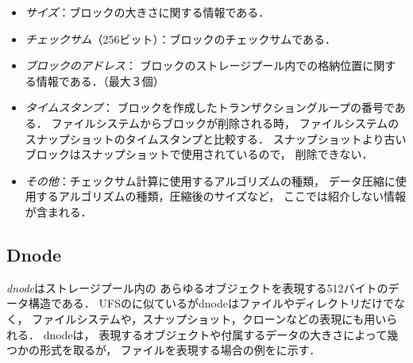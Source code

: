 \begin{itemize}
\item \emph{サイズ}：ブロックの大きさに関する情報である．
\item \emph{チェックサム}（256ビット）：ブロックのチェックサムである．
\item \emph{ブロックのアドレス}：
  ブロックのストレージプール内での格納位置に関する情報である．（最大３個）
\item \emph{タイムスタンプ}：
  ブロックを作成したトランザクショングループの番号である．
  ファイルシステムからブロックが削除される時，
  ファイルシステムのスナップショットのタイムスタンプと比較する．
  スナップショットより古いブロックはスナップショットで使用されているので，
  削除できない．
\item \emph{その他}：チェックサム計算に使用するアルゴリズムの種類，
  データ圧縮に使用するアルゴリズムの種類，圧縮後のサイズなど，
  ここでは紹介しない情報が含まれる．
\end{itemize}

\subsection{Dnode}
\emph{dnode}はストレージプール内の
あらゆるオブジェクトを表現する512バイトのデータ構造である．
UFSの{\inode}に似ているがdnodeはファイルやディレクトリだけでなく，
ファイルシステムや，スナップショット，クローンなどの表現にも用いられる．
dnodeは，
表現するオブジェクトや付属するデータの大きさによって幾つかの形式を取るが，
ファイルを表現する場合の例をに示す．

